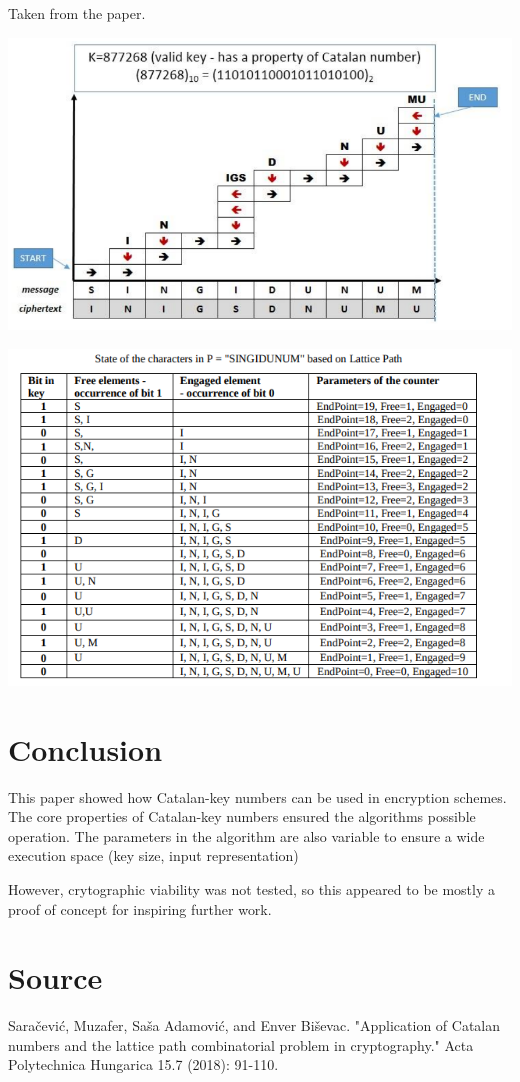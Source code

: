 \documentclass[12pt]{article} %
\begin{document}
Taken from the paper.

\includegraphics[width=\textwidth]{path}

\includegraphics[width=\textwidth]{chart}

\section{Conclusion} 

This paper showed how Catalan-key numbers can be used in encryption schemes.  The core properties of Catalan-key numbers ensured the algorithms possible operation.  The parameters in the algorithm are also variable to ensure a wide execution space (key size, input representation)

However, crytographic viability was not tested, so this appeared to be mostly a proof of concept for inspiring further work.

\section{Source}

Saračević, Muzafer, Saša Adamović, and Enver Biševac. "Application of Catalan numbers and the lattice path combinatorial problem in cryptography." Acta Polytechnica Hungarica 15.7 (2018): 91-110.
    
\end{document}
